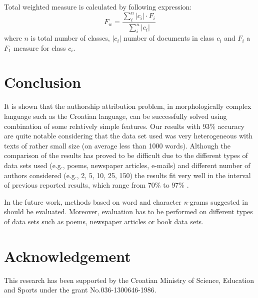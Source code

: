 \documentclass{llncs}
\begin{document}
Total weighted measure is calculated by following expression:
\begin{equation}
F_w = \frac{\sum^{n}_i |c_i|\cdot F_i}{\sum^n_i|c_i|}
\end{equation}
where $n$ is total number of classes, $|c_i|$ number of documents in class
$c_i$ and $F_i$ a $F_1$ measure for class $c_i$.


% 

\section{Conclusion}
It is shown that the authorship attribution problem, in morphologically complex
language such as the Croatian language, can be successfully solved using
combination of some relatively simple features. Our results with 93\% accuracy
are quite notable considering that the data set used was very heterogeneous with
texts of rather small size (on average less than 1000 words). Although the
comparison of the results has proved to be difficult due to the different types of data sets
used (e.g., poems, newspaper articles, e-mails) and different number of authors
considered (e.g., 2, 5, 10, 25, 150) the results fit very well in the interval of
previous reported results, which range from 70\% to 97\%
\cite{coyotl2006authorship,keselj2003n,luyckx2005shallow,stamatatos2001computer}.

In the future work, methods based on word and character \emph{n}-grams suggested
in \cite{keselj2003n,peng2003language,coyotl2006authorship} should be
evaluated. Moreover, evaluation has to be performed on different types of data sets
such as poems, newspaper articles or book data sets.


\section*{Acknowledgement}
This research has been supported by the Croatian Ministry of Science, Education and Sports under the grant No.036-1300646-1986.



\end{document}
